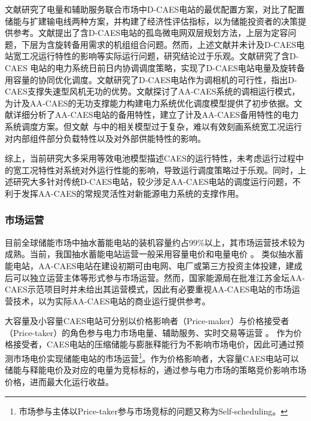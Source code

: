 文献研究了电量和辅助服务联合市场中D-CAES电站的最优配置方案，对比了配置储能与扩建输电线两种方案，并构建了经济性评估指标，以为储能投资者的决策提供参考。文献提出了含D-CAES电站的孤岛微电网双层规划方法，上层为定容问题，下层为含旋转备用需求的机组组合问题。然而，上述文献并未计及D-CAES电站宽工况运行特性的影响等实际运行问题，研究结论过于乐观。文献研究了含D-CAES 电站的电力系统日前日内协调调度策略，实现了D-CAES电站电量及旋转备用容量的协同优化调度。文献研究了D-CAES电站作为调相机的可行性，指出D-CAES支撑失速型风机无功的优势。文献探讨了AA-CAES系统的调相运行模式，为计及AA-CAES的无功支撑能力构建电力系统优化调度模型提供了初步依据。文献详细分析了AA-CAES电站的备用特性，建立了计及AA-CAES备用特性的电力系统调度方案。但文献~与中的相关模型过于复杂，难以有效刻画系统宽工况运行对内部组件部分负载特性以及对外部供能特性的影响。

综上，当前研究大多采用等效电池模型描述CAES的运行特性，未考虑运行过程中的宽工况特性对系统对外运行性能的影响，导致运行调度策略过于乐观\cite{CAES-Review-18-Rui-operation}。同时，上述研究大多针对传统D-CAES电站，较少涉足AA-CAES电站的调度运行问题，不利于发挥AA-CAES的常规灵活性对新能源电力系统的支撑作用。

\subsubsection{市场运营}
目前全球储能市场中抽水蓄能电站的装机容量约占99\%以上，其市场运营技术较为成熟。当前，我国抽水蓄能电站运营一般采用容量电价和电量电价
\cite{PHP-Market-CN-06,PHP-Price-CN-07}。 类似抽水蓄能电站，AA-CAES电站在建设初期可由电网、电厂或第三方投资主体投建，建成后可以独立运营主体等形式参与市场运营\cite{CAES-Review-18-Rui-operation}。然而，国家能源局在批准江苏金坛AA-CAES示范项目时并未给出其运营模式，因此有必要重视AA-CAES电站的市场运营技术，以为实际AA-CAES电站的商业运行提供参考\cite{CAES-Review-18-Rui-operation}。

大容量及小容量CAES电站可分别以价格影响者（Price-maker）与价格接受者（Price-taker）的角色参与电力市场电量、辅助服务、实时交易等运营
\cite{CAES-Review-18-Rui-operation,CAES-BidOff-Curve-17}。 作为价格接受者，CAES电站的压缩储能与膨胀释能行为不影响市场电价，因此可通过预测市场电价实现储能电站的市场运营\footnote{市场参与主体以Price-taker参与市场竞标的问题又称为Self-scheduling。}\cite{CAES-Review-18-Rui-operation}。作为价格影响者，大容量CAES电站可以储能与释能电价及对应的电量为竞标标的，通过参与电力市场的策略竞价影响市场价格，进而最大化运行收益\cite{CAES-Review-18-Rui-operation,Thesis-Shafiee}。

